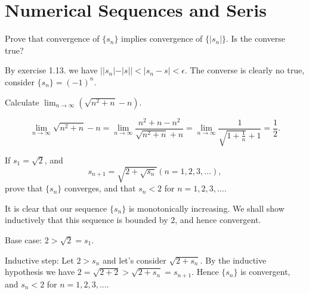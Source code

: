\section{Numerical Sequences and Seris}


\begin{problem}
  Prove that convergence of $\{s_n\}$ implies convergence of $\{|s_n|\}$.
  Is the converse true?
\end{problem}

\begin{solution}
  By exercise 1.13. we have $||s_n| - |s|| < |s_n - s | < \epsilon$.
  The converse is clearly no true, consider $\{s_n\} = (-1)^n$.
\end{solution}

\begin{problem}
  Calculate $\lim_{n\to\infty} (\sqrt{n^2 + n} - n)$.
\end{problem}

\begin{solution}
  \[\lim_{n\to\infty} \sqrt{n^2 + n} - n = \lim_{n\to\infty} \frac{n^2 + n - n^2}{\sqrt{n^2 + n} + n} = \lim_{n\to\infty} \frac{1}{\sqrt{1 + \frac{1}{n}} + 1} = \frac{1}{2}.\]
\end{solution}

\begin{problem}
  If $s_1 = \sqrt{2}$, and
  \[s_{n + 1} = \sqrt{2 + \sqrt{s_n}}  (n = 1, 2, 3, \ldots),\]
  prove that $\{s_n\}$ converges, and that $s_n < 2$ for $n = 1, 2, 3, \ldots$.
\end{problem}

\begin{solution}
  It is clear that our sequence $\{s_n\}$ is monotonically increasing.
  We shall show inductively that this sequence is bounded by $2$, and hence convergent.

  Base case: $2 > \sqrt{2} = s_1$.

  Inductive step: Let $2 > s_n$ and let's consider $\sqrt{2 + s_n}$.
  By the inductive hypothesis we have $2 = \sqrt{2 + 2} > \sqrt{2 + s_n} = s_{n + 1}$.
  Hence $\{s_n\}$ is convergent, and $s_n < 2$ for $n = 1, 2, 3, \ldots$.
\end{solution}

